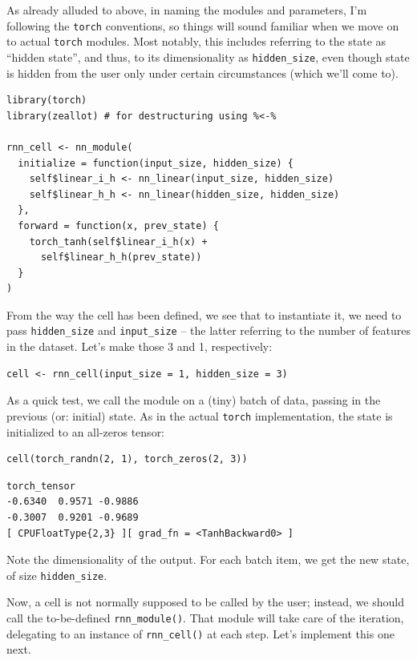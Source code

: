 \documentclass[
  letterpaper,
]{krantz}
\begin{document}
As already alluded to above, in naming the modules and parameters, I'm
following the \texttt{torch} conventions, so things will sound familiar
when we move on to actual \texttt{torch} modules. Most notably, this
includes referring to the state as ``hidden state'', and thus, to its
dimensionality as \texttt{hidden\_size}, even though state is hidden
from the user only under certain circumstances (which we'll come to).

\begin{verbatim}
library(torch)
library(zeallot) # for destructuring using %<-%

rnn_cell <- nn_module(
  initialize = function(input_size, hidden_size) {
    self$linear_i_h <- nn_linear(input_size, hidden_size)
    self$linear_h_h <- nn_linear(hidden_size, hidden_size)
  },
  forward = function(x, prev_state) {
    torch_tanh(self$linear_i_h(x) +
      self$linear_h_h(prev_state))
  }
)
\end{verbatim}

From the way the cell has been defined, we see that to instantiate it,
we need to pass \texttt{hidden\_size} and \texttt{input\_size} -- the
latter referring to the number of features in the dataset. Let's make
those 3 and 1, respectively:

\begin{verbatim}
cell <- rnn_cell(input_size = 1, hidden_size = 3)
\end{verbatim}

As a quick test, we call the module on a (tiny) batch of data, passing
in the previous (or: initial) state. As in the actual \texttt{torch}
implementation, the state is initialized to an all-zeros tensor:

\begin{verbatim}
cell(torch_randn(2, 1), torch_zeros(2, 3))
\end{verbatim}

\begin{verbatim}
torch_tensor
-0.6340  0.9571 -0.9886
-0.3007  0.9201 -0.9689
[ CPUFloatType{2,3} ][ grad_fn = <TanhBackward0> ]
\end{verbatim}

Note the dimensionality of the output. For each batch item, we get the
new state, of size \texttt{hidden\_size}.

Now, a cell is not normally supposed to be called by the user; instead,
we should call the to-be-defined \texttt{rnn\_module()}. That module
will take care of the iteration, delegating to an instance of
\texttt{rnn\_cell()} at each step. Let's implement this one next.
\end{document}
